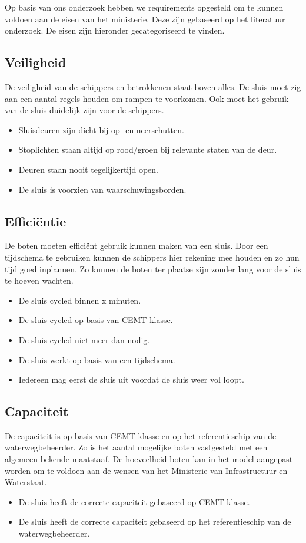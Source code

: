 \documentclass[../verslag.tex]{subfiles}
\begin{document}
Op basis van ons onderzoek hebben we requirements opgesteld om te kunnen voldoen aan de eisen van het ministerie. Deze zijn gebaseerd op het literatuur onderzoek. De eisen zijn hieronder gecategoriseerd te vinden.

\subsection{Veiligheid}
De veiligheid van de schippers en betrokkenen staat boven alles. De sluis moet zig aan een aantal regels houden om rampen te voorkomen. Ook moet het gebruik van de sluis duidelijk zijn voor de schippers.
\begin{itemize}
    \item Sluisdeuren zijn dicht bij op- en neerschutten.
    \item Stoplichten staan altijd op rood/groen bij relevante staten van de deur.
    \item Deuren staan nooit tegelijkertijd open.
    \item De sluis is voorzien van waarschuwingsborden.
\end{itemize}

\subsection{Efficiëntie}
De boten moeten efficiënt gebruik kunnen maken van een sluis. Door een tijdschema te gebruiken kunnen de schippers hier rekening mee houden en zo hun tijd goed inplannen. Zo kunnen de boten ter plaatse zijn zonder lang voor de sluis te hoeven wachten.
\begin{itemize}
    \item De sluis cycled binnen x minuten.
    \item De sluis cycled op basis van CEMT-klasse.
    \item De sluis cycled niet meer dan nodig.
    \item De sluis werkt op basis van een tijdschema.
    \item Iedereen mag eerst de sluis uit voordat de sluis weer vol loopt.
\end{itemize}

\subsection{Capaciteit}
De capaciteit is op basis van CEMT-klasse en op het referentieschip van de waterwegbeheerder. Zo is het aantal mogelijke boten vastgesteld met een algemeen bekende maatstaaf. De hoeveelheid boten kan in het model aangepast worden om te voldoen aan de wensen van het Ministerie van Infrastructuur en Waterstaat.
\begin{itemize}
    \item De sluis heeft de correcte capaciteit gebaseerd op CEMT-klasse.
    \item De sluis heeft de correcte capaciteit gebaseerd op het referentieschip van de waterwegbeheerder.
\end{itemize}
\end{document}
